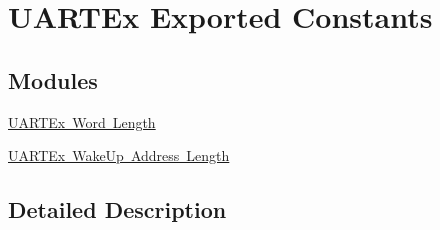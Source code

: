 \hypertarget{group___u_a_r_t_ex___exported___constants}{}\section{U\+A\+R\+T\+Ex Exported Constants}
\label{group___u_a_r_t_ex___exported___constants}
\subsection*{Modules}
\begin{DoxyCompactItemize}
\item 
\mbox{\hyperlink{group___u_a_r_t_ex___word___length}{U\+A\+R\+T\+Ex Word Length}}
\item 
\mbox{\hyperlink{group___u_a_r_t_ex___wake_up___address___length}{U\+A\+R\+T\+Ex Wake\+Up Address Length}}
\end{DoxyCompactItemize}


\subsection{Detailed Description}
